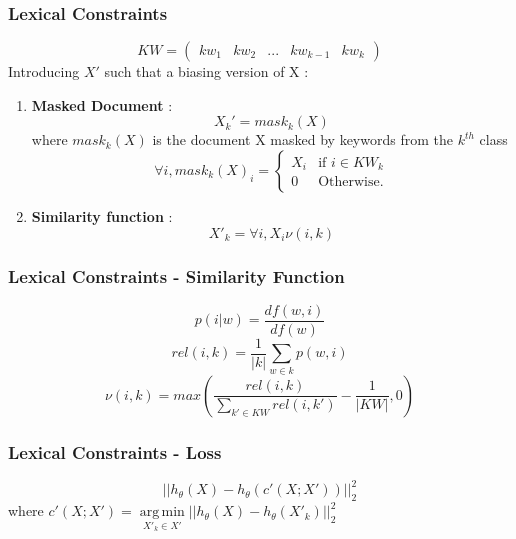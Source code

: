 \documentclass{beamer}
\DeclareMathOperator*{\argmin}{arg\,min}
\begin{document}
\begin{frame}
\frametitle{Lexical Constraints}
\begin{equation*}
  KW = \begin{pmatrix} kw_1 & kw_2 & ... & kw_{k-1} & kw_{k}
\end {pmatrix}
\end{equation*}
Introducing $X'$ such that a biasing version of X :
\begin{enumerate}
\item \textbf{Masked Document} :
\begin{equation*}
X_k' = mask_k(X) 
\end{equation*}
where $mask_k(X)$ is the document X masked by keywords from the $k^{th}$ class
\begin{equation*}
\forall i, mask_k(X)_i = \left\{
\begin{array}{ll}
  X_i & \mbox{if } i \in KW_k\\
  0 & \mbox{Otherwise.}
\end{array}
\right. 
\end{equation*}
\item \textbf{Similarity function} :
\begin{equation*}
   X'_k = \forall i, X_i \nu(i,k) 
\end{equation*}
\end{enumerate}
\end{frame}

\begin{frame}
\frametitle{Lexical Constraints - Similarity Function}
\begin{equation*}\label{sim}
p(i|w) = \frac{df(w,i)}{df(w)}
\end{equation*}
\begin{equation*}\label{rel}
  rel(i,k) = \frac{1}{|k|} \sum\limits_{w \in k} p(w,i)
\end{equation*}
\begin{equation*}\label{nu}
  \nu(i,k) = max \left(\frac{rel(i,k)}{\sum\limits_{k' \in KW}rel(i,k')} - \frac{1}{|KW|}, 0\right)
\end{equation*}
\end{frame}

\begin{frame}
\frametitle{Lexical Constraints - Loss}
\begin{equation*}
|| h_\theta(X) - h_\theta(c'(X ; X' )) ||_2^2
\end{equation*}
where $c'(X ; X') = \argmin\limits_{X'_k \in X'}
||h_\theta(X) - h_\theta(X'_k) ||_2^2$
\end{frame}
\end{document}
